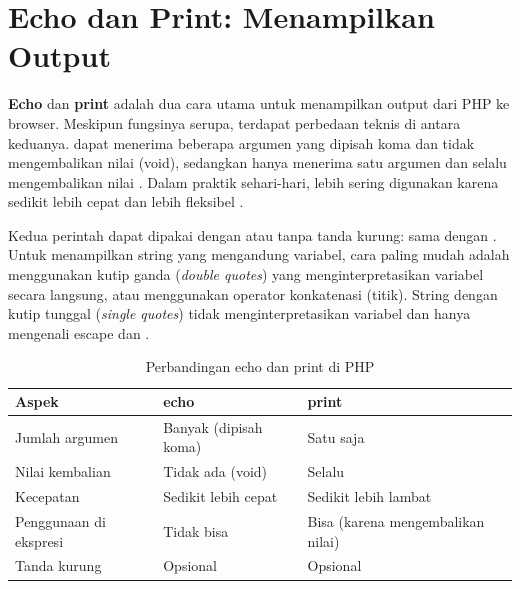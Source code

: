 ﻿\section{Echo dan Print: Menampilkan Output}

\textbf{Echo} dan \textbf{print} adalah dua cara utama untuk menampilkan output dari PHP ke browser. Meskipun fungsinya serupa, terdapat perbedaan teknis di antara keduanya.  dapat menerima beberapa argumen yang dipisah koma dan tidak mengembalikan nilai (void), sedangkan  hanya menerima satu argumen dan selalu mengembalikan nilai . Dalam praktik sehari-hari,  lebih sering digunakan karena sedikit lebih cepat dan lebih fleksibel \cite{phpManual}.

Kedua perintah dapat dipakai dengan atau tanpa tanda kurung:  sama dengan . Untuk menampilkan string yang mengandung variabel, cara paling mudah adalah menggunakan kutip ganda (\textit{double quotes}) yang menginterpretasikan variabel secara langsung, atau menggunakan operator konkatenasi (titik). String dengan kutip tunggal (\textit{single quotes}) tidak menginterpretasikan variabel dan hanya mengenali escape \code{\textbackslash\textbackslash} dan  \cite{w3schoolsPhp}.

\begin{table}[H]
\centering
\begin{tabular}{|P{3cm}|P{4.5cm}|P{4.5cm}|}
\hline
\textbf{Aspek} & \textbf{echo} & \textbf{print} \\
\hline
Jumlah argumen & Banyak (dipisah koma) & Satu saja \\
\hline
Nilai kembalian & Tidak ada (void) & Selalu  \\
\hline
Kecepatan & Sedikit lebih cepat & Sedikit lebih lambat \\
\hline
Penggunaan di ekspresi & Tidak bisa & Bisa (karena mengembalikan nilai) \\
\hline
Tanda kurung & Opsional & Opsional \\
\hline
\end{tabular}
\caption{Perbandingan echo dan print di PHP}
\end{table}


